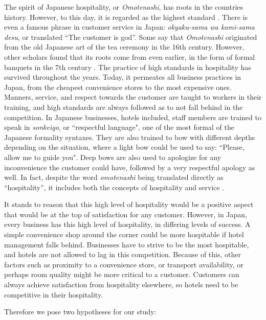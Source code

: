 \documentclass[smallextended,natbib]{svjour3}       %
\begin{document}
    The spirit of Japanese hospitality, or \textit{Omotenashi}, has roots in the countries history. However, to this day, it is regarded as the highest standard \cite{ikeda2013omotenashi, al2015characteristics}. There is even a famous phrase in customer service in Japan: \textit{okyaku-sama wa kami-sama desu}, or translated ``The customer is god''. Some say that \textit{Omotenashi} originated from the old Japanese art of the tea ceremony in the 16th century. However, other scholars found that its roots come from even earlier, in the form of formal banquets in the 7th century \cite{aishima2015origin}. The practice of high standards in hospitality has survived throughout the years. Today, it permeates all business practices in Japan, from the cheapest convenience stores to the most expensive ones. Manners, service, and respect towards the customer are taught to workers in their training, and high standards are always followed as to not fall behind in the competition. In Japanese businesses, hotels included, staff members are trained to speak in \textit{sonkeigo}, or ``respectful language", one of the most formal of the Japanese formality syntaxes. They are also trained to bow with different depths depending on the situation, where a light bow could be used to say: ``Please, allow me to guide you". Deep bows are also used to apologize for any inconvenience the customer could have, followed by a very respectful apology as well. In fact, despite the word \textit{omotenashi} being translated directly as ``hospitality'', it includes both the concepts of hospitality and service \cite{Kuboyama2020}. 

    It stands to reason that this high level of hospitality would be a positive aspect that would be at the top of satisfaction for any customer. However, in Japan, every business has this high level of hospitality, in differing levels of success. A simple convenience shop around the corner could be more hospitable if hotel management falls behind. Businesses have to strive to be the most hospitable, and hotels are not allowed to lag in this competition. Because of this, other factors such as proximity to a convenience store, or transport availability, or perhaps room quality might be more critical to a customer. Customers can always achieve satisfaction from hospitality elsewhere, so hotels need to be competitive in their hospitality. 

    Therefore we pose two hypotheses for our study:
\end{document}

